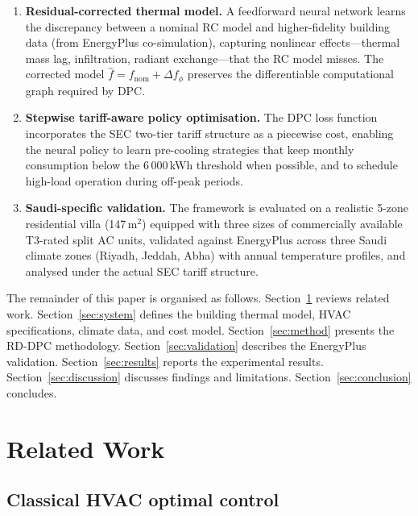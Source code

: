 \documentclass[12pt]{article}
\theoremstyle{plain}
\theoremstyle{definition}
\begin{document}
\begin{enumerate}[leftmargin=*]
\item \textbf{Residual-corrected thermal model.} A feedforward neural network learns the discrepancy between a nominal RC model and higher-fidelity building data (from EnergyPlus co-simulation), capturing nonlinear effects---thermal mass lag, infiltration, radiant exchange---that the RC model misses. The corrected model $\hat{f} = f_{\text{nom}} + \Delta f_\phi$ preserves the differentiable computational graph required by DPC.

\item \textbf{Stepwise tariff-aware policy optimisation.} The DPC loss function incorporates the SEC two-tier tariff structure as a piecewise cost, enabling the neural policy to learn pre-cooling strategies that keep monthly consumption below the 6\,000\,kWh threshold when possible, and to schedule high-load operation during off-peak periods.

\item \textbf{Saudi-specific validation.} The framework is evaluated on a realistic 5-zone residential villa (147\,m$^2$) equipped with three sizes of commercially available T3-rated split AC units, validated against EnergyPlus across three Saudi climate zones (Riyadh, Jeddah, Abha) with annual temperature profiles, and analysed under the actual SEC tariff structure.
\end{enumerate}

The remainder of this paper is organised as follows. Section~\ref{sec:related} reviews related work. Section~\ref{sec:system} defines the building thermal model, HVAC specifications, climate data, and cost model. Section~\ref{sec:method} presents the RD-DPC methodology. Section~\ref{sec:validation} describes the EnergyPlus validation. Section~\ref{sec:results} reports the experimental results. Section~\ref{sec:discussion} discusses findings and limitations. Section~\ref{sec:conclusion} concludes.

\section{Related Work}\label{sec:related}

\subsection{Classical HVAC optimal control}
\end{document}

